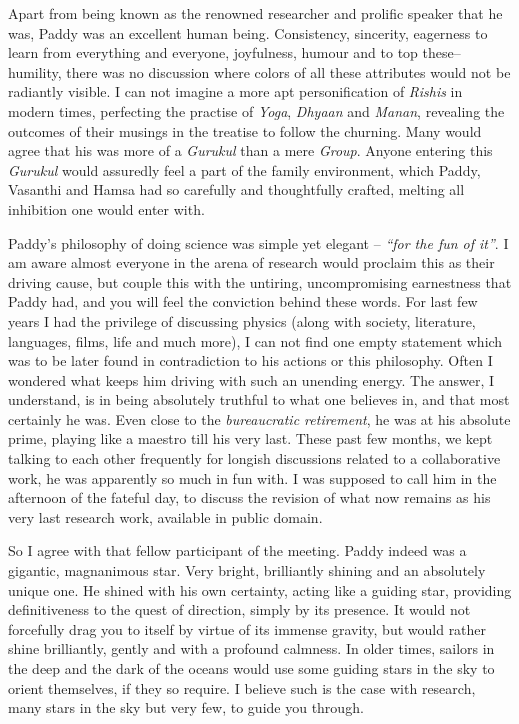 \documentclass[prd, preprint, longbibliography, 12pt]{revtex4-2}
\begin{document}
Apart from being known as the renowned researcher and prolific speaker that he was,  Paddy was an excellent human being. Consistency, sincerity, eagerness to learn from everything and everyone, joyfulness, humour  and to top these-- humility, there was no discussion where colors of all these attributes would not be radiantly visible. I can not imagine a more apt personification of  \textit{Rishis} in modern times,  perfecting the practise of \textit{Yoga},  \textit{Dhyaan} and \textit{ Manan}, revealing the outcomes of their musings  in the treatise to follow the churning. Many would agree that his was more of a \textit{Gurukul} than a mere \textit{Group}. Anyone entering this \textit{Gurukul} would assuredly feel a part of the family environment,  which Paddy, Vasanthi and Hamsa had so carefully and thoughtfully crafted, melting all inhibition one would enter with.
 
Paddy's philosophy of doing science was simple yet elegant -- \textit{ ``for the fun of it''}. I am aware almost everyone in the arena of research would proclaim this as their driving cause, but couple this with the untiring, uncompromising earnestness that Paddy had, and you will feel the conviction behind these words. For last few years I had the privilege of discussing physics (along with society, literature, languages, films,  life and much more), I can not find one empty statement which was to be later found in contradiction to his actions or this philosophy. Often I wondered what keeps him driving with such an unending energy.  The answer, I understand, is in being absolutely truthful to what one believes in, and that most certainly he was. Even close to the \textit{bureaucratic retirement}, he was at his absolute prime, playing like a maestro till his very last. These past few months, we kept talking to each other frequently for longish discussions related to a collaborative work, he was apparently so much in fun with. I was supposed to call him in the afternoon of the fateful day, to discuss the revision of what now remains as his very last research work, available in  public domain. 


So I agree with that fellow participant of the meeting. Paddy indeed was a gigantic, magnanimous star. Very bright, brilliantly shining and  an absolutely unique one. He shined with his own certainty, acting like a guiding star, providing definitiveness to the quest of direction, simply by its presence. It would not forcefully drag you to itself by virtue of its immense gravity, but would rather shine brilliantly, gently and with a profound calmness.  In older times, sailors in the deep and the dark of the oceans would use  some guiding stars in the sky to orient themselves, if they so require. I believe such is the case with research, many stars in the sky but very few, to guide you through.
\end{document}
